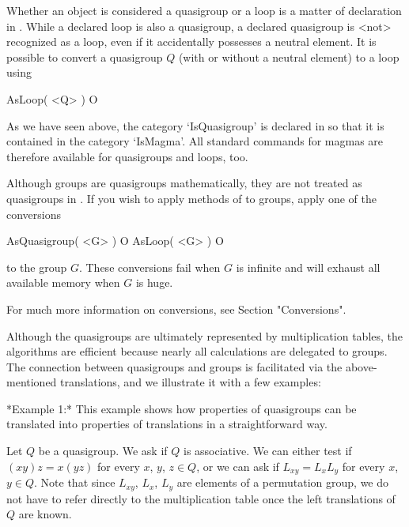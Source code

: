 
Whether an object is considered a quasigroup or a loop is a matter of
declaration in {\LOOPS}. While a declared loop is also a quasigroup, a declared
quasigroup is <not> recognized as a loop, even if it accidentally possesses a
neutral element. It is possible to convert a quasigroup $Q$ (with or without a
neutral element) to a loop using

\>AsLoop( <Q> ) O

As we have seen above, the category `IsQuasigroup' is declared in {\LOOPS} so
that it is contained in the category `IsMagma'. All standard {\GAP} commands
for magmas are therefore available for quasigroups and loops, too.

Although groups are quasigroups mathematically, they are not treated as
quasigroups in {\LOOPS}. If you wish to apply methods of {\LOOPS} to groups,
apply one of the conversions

\>AsQuasigroup( <G> ) O
\>AsLoop( <G> ) O

to the group $G$. These conversions fail when $G$ is infinite and will exhaust
all available memory when $G$ is huge.

For much more information on conversions, see Section "Conversions".



Although the quasigroups are ultimately represented by multiplication tables,
the algorithms are efficient because nearly all calculations are delegated to
groups. The connection between quasigroups and groups is facilitated via the
above-mentioned translations, and we illustrate it with a few examples:

\medskip

*Example 1:* This example shows how properties of quasigroups can be translated
into properties of translations in a straightforward way.

Let $Q$ be a quasigroup. We ask if $Q$ is associative. We can either test if
$(xy)z=x(yz)$ for every $x$, $y$, $z\in Q$, or we can ask if $L_{xy}=L_xL_y$
for every $x$, $y\in Q$. Note that since $L_{xy}$, $L_x$, $L_y$ are elements of
a permutation group, we do not have to refer directly to the multiplication
table once the left translations of $Q$ are known.

